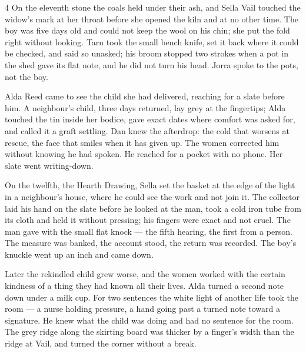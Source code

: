 
\scenebreak


\scenebreak

\scenebreak

\CRtailpiece
\begin{CRchronicle}{4}
On the eleventh stone the coals held under their ash, and Sella Vail touched the widow’s mark at her throat before she opened the kiln and at no other time. The boy was five days old and could not keep the wool on his chin; she put the fold right without looking. Tarn took the small bench knife, set it back where it could be checked, and said so unasked; his broom stopped two strokes when a pot in the shed gave its flat note, and he did not turn his head. Jorra spoke to the pots, not the boy.

Alda Reed came to see the child she had delivered, reaching for a slate before him. A neighbour’s child, three days returned, lay grey at the fingertips; Alda touched the tin inside her bodice, gave exact dates where comfort was asked for, and called it a graft settling. Dan knew the afterdrop: the cold that worsens at rescue, the face that smiles when it has given up. The women corrected him without knowing he had spoken. He reached for a pocket with no phone. Her slate went writing-down.

On the twelfth, the Hearth Drawing, Sella set the basket at the edge of the light in a neighbour’s house, where he could see the work and not join it. The collector laid his hand on the slate before he looked at the man, took a cold iron tube from its cloth and held it without pressing; his fingers were exact and not cruel. The man gave with the small flat knock --- the fifth hearing, the first from a person. The measure was banked, the account stood, the return was recorded. The boy’s knuckle went up an inch and came down.

Later the rekindled child grew worse, and the women worked with the certain kindness of a thing they had known all their lives. Alda turned a second note down under a milk cup. For two sentences the white light of another life took the room --- a nurse holding pressure, a hand going past a turned note toward a signature. He knew what the child was doing and had no sentence for the room. The grey ridge along the skirting board was thicker by a finger’s width than the ridge at Vail, and turned the corner without a break.


\end{CRchronicle}

